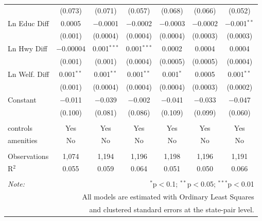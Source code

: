 \begin{table}[!htbp]
\begin{tabular}{@{\extracolsep{5pt}}lcccccc}
  & (0.073) & (0.071) & (0.057) & (0.068) & (0.066) & (0.052) \\ 
  Ln Educ Diff & 0.0005 & $-$0.0001 & $-$0.0002 & $-$0.0003 & $-$0.0002 & $-$0.001$^{**}$ \\ 
  & (0.001) & (0.0004) & (0.0004) & (0.0004) & (0.0003) & (0.0003) \\ 
  Ln Hwy Diff & $-$0.00004 & 0.001$^{***}$ & 0.001$^{***}$ & 0.0002 & 0.0004 & 0.0004 \\ 
  & (0.001) & (0.001) & (0.0004) & (0.0005) & (0.0005) & (0.0004) \\ 
  Ln Welf. Diff & 0.001$^{**}$ & 0.001$^{**}$ & 0.001$^{**}$ & 0.001$^{*}$ & 0.0005 & 0.001$^{**}$ \\ 
  & (0.001) & (0.0004) & (0.0004) & (0.0004) & (0.0003) & (0.0002) \\ 
  Constant & $-$0.011 & $-$0.039 & $-$0.002 & $-$0.041 & $-$0.033 & $-$0.047 \\ 
  & (0.100) & (0.081) & (0.086) & (0.109) & (0.099) & (0.060) \\ 
 \hline \\[-1.8ex] 
controls & Yes & Yes & Yes & Yes & Yes & Yes \\ 
amenities & No & No & No & No & No & No \\ 
\hline \\[-1.8ex] 
Observations & 1,074 & 1,194 & 1,196 & 1,198 & 1,196 & 1,191 \\ 
R$^{2}$ & 0.055 & 0.059 & 0.064 & 0.051 & 0.050 & 0.066 \\ 
\hline 
\hline \\[-1.8ex] 
\textit{Note:}  & \multicolumn{6}{r}{$^{*}$p$<$0.1; $^{**}$p$<$0.05; $^{***}$p$<$0.01} \\ 
 & \multicolumn{6}{r}{All models are estimated with Ordinary Least Squares} \\ 
 & \multicolumn{6}{r}{and clustered standard errors at the state-pair level.} \\ 
\end{tabular} 
\end{table} 
